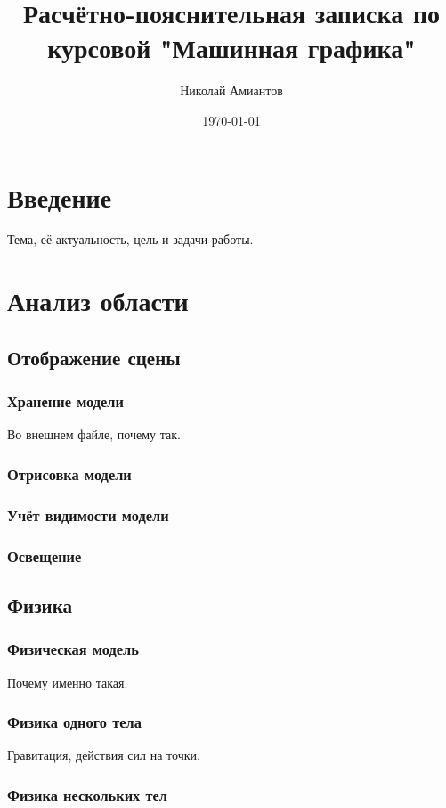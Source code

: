\documentclass[a4paper,12pt]{article}
\title{Расчётно-пояснительная записка по курсовой "Машинная графика"}
\author{Николай Амиантов}
\date{\today}
\begin{document}
\section{Введение}

Тема, её актуальность, цель и задачи работы.

\section{Анализ области}

\subsection{Отображение сцены}

\subsubsection{Хранение модели}

Во внешнем файле, почему так.

\subsubsection{Отрисовка модели}

\subsubsection{Учёт видимости модели}

\subsubsection{Освещение}

\subsection{Физика}

\subsubsection{Физическая модель}

Почему именно такая.

\subsubsection{Физика одного тела}

Гравитация, действия сил на точки.

\subsubsection{Физика нескольких тел}
\end{document}
